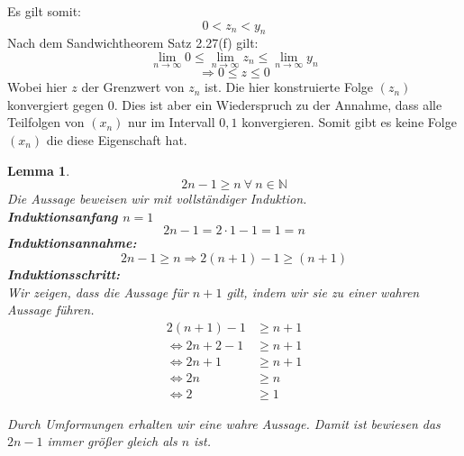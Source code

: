 \documentclass[11pt]{article}
\begin{document}
\begin{enumerate}[ label = (\roman*)]
            Es gilt somit:
            \[ 0 < z_n < y_n \]
            Nach dem Sandwichtheorem Satz 2.27(f) gilt:
            \[ \lim_{n \to \infty} 0 \leq \lim_{n \to \infty} z_n \leq \lim_{n \to \infty} y_n \]
            \[ \Rightarrow 0 \leq z \leq 0\]
            Wobei hier \(z\) der Grenzwert von \(z_n\) ist. Die hier konstruierte Folge \((z_n)\) konvergiert gegen 0. Dies ist aber ein Wiederspruch zu der Annahme,
            dass alle Teilfolgen von \((x_n)\) nur im Intervall \(0, 1\) konvergieren.
            Somit gibt es keine Folge \((x_n)\) die diese Eigenschaft hat.

        \end{enumerate}

    \newtheorem{lemma1}[lemma_counter]{Lemma}
    \begin{lemma1}
        \[ 2n -1 \geq n \: \forall \: n \in \mathbb{N} \]
        Die Aussage beweisen wir mit vollständiger Induktion. \\
        \textbf{Induktionsanfang \(n=1\)}
        \[2n - 1 = 2 \cdot 1 - 1 = 1 = n\]
        \textbf{Induktionsannahme:}
        \[2n - 1 \geq n \Rightarrow 2(n+1) -1 \geq (n+1)\]
        \textbf{Induktionsschritt:} \\
        Wir zeigen, dass die Aussage für \(n+1\) gilt, indem wir sie zu einer wahren Aussage führen.
        \begin{align*}
            2 (n+1) - 1 & \geq n + 1 \\
            \Leftrightarrow 2n + 2 - 1 & \geq n + 1 \\
            \Leftrightarrow 2n + 1 & \geq n + 1 \\
            \Leftrightarrow 2n & \geq n \\
            \Leftrightarrow 2 & \geq 1 
        \end{align*}
   
        Durch Umformungen erhalten wir eine wahre Aussage. Damit ist bewiesen das \(2n - 1\) immer größer gleich als \(n\) ist.
    \end{lemma1}
\end{document}
